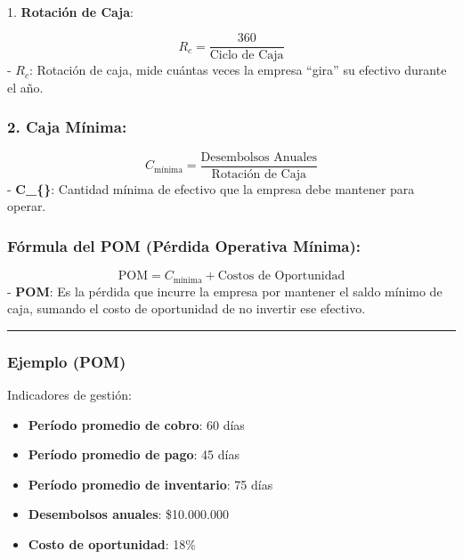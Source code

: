 \documentclass[
  letterpaper,
  DIV=11,
  numbers=noendperiod]{scrartcl}
\makeatletter
\let\oldparagraph\paragraph
\renewcommand{\paragraph}{
    \@ifstar
      \xxxParagraphStar
      \xxxParagraphNoStar
  }
\newcommand{\xxxParagraphStar}[1]{\oldparagraph*{#1}\mbox{}}
\newcommand{\xxxParagraphNoStar}[1]{\oldparagraph{#1}\mbox{}}
\providecommand{\tightlist}{%
  \setlength{\itemsep}{0pt}\setlength{\parskip}{0pt}}\usepackage{longtable,booktabs,array}
\makeatother
\begin{document}
\paragraph{\texorpdfstring{1. \textbf{Rotación de
Caja}:}{1. Rotación de Caja:}}\label{rotaciuxf3n-de-caja}

\[
   R_c = \frac{\text{360}}{\text{Ciclo de Caja}}
   \] - \(R_c\): Rotación de caja, mide cuántas veces la empresa
``gira'' su efectivo durante el año.

\subsubsection{\texorpdfstring{2. \textbf{Caja
Mínima}:}{2. Caja Mínima:}}\label{caja-muxednima}

\[
   C_{\text{mínima}} = \frac{\text{Desembolsos Anuales}}{\text{Rotación de Caja}}
   \] - \textbf{C\_\{\}}: Cantidad mínima de efectivo que
la empresa debe mantener para operar.

\subsubsection{Fórmula del POM (Pérdida Operativa
Mínima):}\label{fuxf3rmula-del-pom-puxe9rdida-operativa-muxednima}

\[
   \text{POM} = C_{\text{mínima}} + \text{Costos de Oportunidad}
   \] - \textbf{POM}: Es la pérdida que incurre la empresa por mantener
el saldo mínimo de caja, sumando el costo de oportunidad de no invertir
ese efectivo.

\begin{center}\rule{0.5\linewidth}{0.5pt}\end{center}

\subsubsection{Ejemplo (POM)}\label{ejemplo-pom}

Indicadores de gestión:

\begin{itemize}
\tightlist
\item
  \textbf{Período promedio de cobro}: 60 días
\item
  \textbf{Período promedio de pago}: 45 días
\item
  \textbf{Período promedio de inventario}: 75 días
\item
  \textbf{Desembolsos anuales}: \$10.000.000
\item
  \textbf{Costo de oportunidad}: 18\%
\end{itemize}
\end{document}
